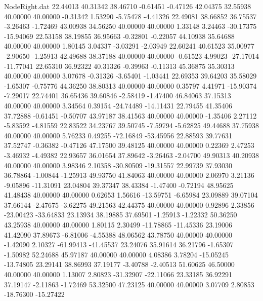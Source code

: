 \begin{filecontents}{NodeRight.dat}
  22.44013   40.31342   38.46710    -0.61451   -0.47126   42.04375   32.55938   40.00000   40.00000   -0.31342    1.53290   -5.75478   -4.41326
  22.49081   38.66852   36.75537    -3.26463   -1.72469   43.00938   34.56250   40.00000   40.00000    1.33148    3.24463  -30.17375  -15.94069
  22.53158   38.19855   36.95663    -0.32801   -0.22057   44.10938   35.64688   40.00000   40.00000    1.80145    3.04337   -3.03291   -2.03949
  22.60241   40.61523   35.00977    -2.90650   -1.25913   42.49688   38.37188   40.00000   40.00000   -0.61523    4.99023  -27.17014  -11.77041
  22.65310   36.92322   40.31326    -0.39963   -0.11313   45.36875   35.30313   40.00000   40.00000    3.07678   -0.31326   -3.65401   -1.03441
  22.69353   39.64203   35.58029    -1.65307   -0.75776   44.36250   38.80313   40.00000   40.00000    0.35797    4.41971  -15.90374   -7.29017
  22.74401   36.65436   39.60846    -2.58419   -1.47400   46.84063   37.15313   40.00000   40.00000    3.34564    0.39154  -24.74489  -14.11431
  22.79455   41.35406   37.72888    -0.61451   -0.50707   43.97187   38.41563   40.00000   40.00000   -1.35406    2.27112   -5.83592   -4.81559
  22.83522   34.23767   39.50745    -7.59794   -5.62825   49.44688   37.75938   40.00000   40.00000    5.76233    0.49255  -72.16849  -53.45956
  22.88593   39.77631   37.52747    -0.36382   -0.47126   47.17500   39.48125   40.00000   40.00000    0.22369    2.47253   -3.46932   -4.49382
  22.93657   36.01654   37.89642    -3.26463   -2.04700   49.90313   40.20938   40.00000   40.00000    3.98346    2.10358  -30.80509  -19.31557
  22.99739   37.93030   36.78864    -1.00844   -1.25913   49.93750   41.84063   40.00000   40.00000    2.06970    3.21136   -9.05896  -11.31091
  23.04804   39.37347   38.43384    -1.47400   -0.72194   48.95625   41.48438   40.00000   40.00000    0.62653    1.56616  -13.59751   -6.65984
  23.09889   39.07104   37.66144    -2.47675   -3.62275   49.21563   42.44375   40.00000   40.00000    0.92896    2.33856  -23.00423  -33.64833
  23.13934   38.19885   37.69501    -1.25913   -1.22332   50.36250   43.25938   40.00000   40.00000    1.80115    2.30499  -11.78865  -11.45336
  23.19006   41.42090   37.89673    -6.81006   -4.55388   48.06562   43.78750   40.00000   40.00000   -1.42090    2.10327  -61.99413  -41.45537
  23.24076   35.91614   36.21796    -1.65307   -1.50982   52.24688   45.97187   40.00000   40.00000    4.08386    3.78204  -15.05245  -13.74805
  23.29141   38.86993   37.19177    -3.40788   -2.40513   51.60625   46.50000   40.00000   40.00000    1.13007    2.80823  -31.32907  -22.11066
  23.33185   36.92291   37.19147    -2.11863   -1.72469   53.32500   47.23125   40.00000   40.00000    3.07709    2.80853  -18.76300  -15.27422

\end{filecontents}
